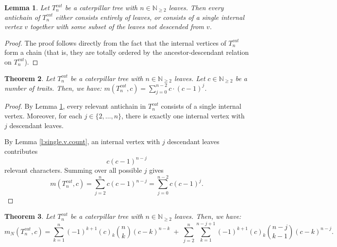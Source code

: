 \documentclass{amsart}
\newtheorem{theorem}{Theorem}
\newtheorem{lemma}[theorem]{Lemma}
\theoremstyle{definition}
\begin{document}
\begin{lemma}\label{lem:cat_anti}
    Let $T^{cat}_n$ be a caterpillar tree with $n \in \mathbb{N}_{\ge 2}$ leaves. Then every antichain of $T_n^{cat}$ either consists entirely of leaves, or consists of a single internal vertex $v$ together with some subset of the leaves not descended from $v$.
\end{lemma}

\begin{proof}
    The proof follows directly from the fact that the internal vertices of $T_n^{cat}$ form a chain (that is, they are totally ordered by the ancestor-descendant relation on $T_n^{cat}$).
\end{proof}

\begin{theorem}\label{thm_catvalue}
Let $T_n^{cat}$ be a caterpillar tree with $n\in\mathbb{N}_{\geq 2}$ leaves. Let $c\in\mathbb{N}_{\geq 2}$ be a number of traits. Then, we have:  $m(T_n^{cat},c)=\sum\limits_{j=0}^{n-2}c\cdot(c-1)^{j}$.
\end{theorem}

\begin{proof}
By Lemma \ref{lem:cat_anti}, every relevant antichain in $T_n^{cat}$ consists of a single internal vertex. Moreover, for each $j\in\{2,\dots,n\}$, there is exactly one internal vertex with $j$ descendant leaves.

By Lemma \ref{l:single.v.count}, an internal vertex with $j$ descendant leaves contributes
\[
c(c-1)^{n-j}
\]
relevant characters. Summing over all possible $j$ gives
\[
m(T_n^{cat},c)
=
\sum_{j=2}^{n} c(c-1)^{n-j}
=
\sum_{j=0}^{n-2} c(c-1)^j.
\]
\end{proof}

\begin{theorem}\label{thm_catvalue_nonrelevant}
Let $T_n^{cat}$ be a caterpillar tree with $n\in\mathbb{N}_{\geq 2}$ leaves. Then, we have:  \[
m_N(T_n^{cat},c)
=
\sum_{k=1}^{n}
(-1)^{k+1}
(c)_k
\binom{n}{k}
(c-k)^{n-k}
\;+\;
\sum_{j=2}^{n}
\sum_{k=1}^{n-j+1}
(-1)^{k+1}
(c)_k
\binom{n-j}{k-1}
(c-k)^{n-j}.
\]
\end{theorem}
\end{document}

